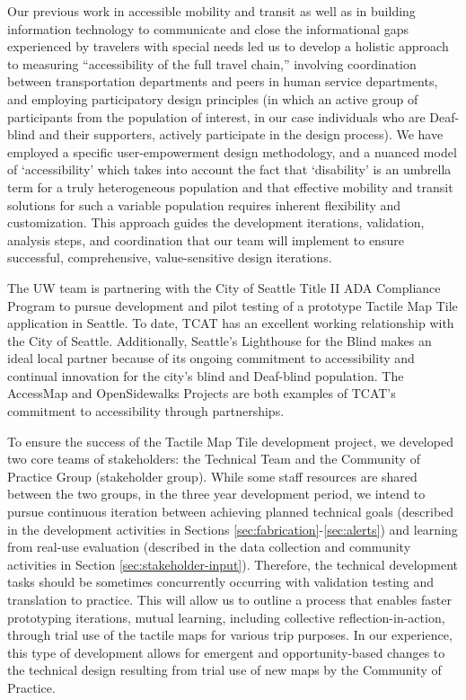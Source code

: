 Our previous work in accessible mobility and transit as well as in building information technology to communicate and close the informational gaps experienced by travelers with special needs led us to develop a holistic approach to measuring “accessibility of the full travel chain,” involving coordination between transportation departments and peers in human service departments, and employing participatory design principles (in which an active group of participants from the population of interest, in our case individuals who are Deaf-blind and their supporters, actively participate in the design process). We have employed a specific user-empowerment design methodology, and a nuanced model of ‘accessibility’ which takes into account the fact that ‘disability’ is an umbrella term for a truly heterogeneous population and that effective mobility and transit solutions for such a variable population requires inherent flexibility and customization. This approach guides the development iterations, validation, analysis steps, and coordination that our team will implement to ensure successful, comprehensive, value-sensitive design iterations.

The UW team is partnering with the City of Seattle Title II ADA Compliance Program to pursue development and pilot testing of a prototype Tactile Map Tile application in Seattle. To date, TCAT has an excellent working relationship with the City of Seattle. Additionally, Seattle's Lighthouse for the Blind makes an ideal local partner because of its ongoing commitment to accessibility and continual innovation for the city's blind and Deaf-blind population. The AccessMap and OpenSidewalks Projects are both examples of TCAT's commitment to accessibility through partnerships. 

To ensure the success of the Tactile Map Tile development project, we developed two core teams of stakeholders: the Technical Team and the Community of Practice Group (stakeholder group). While some staff resources are shared between the two groups, in the three year development period, we intend to pursue continuous iteration between achieving planned technical goals (described in the development activities in Sections \ref{sec:fabrication}-\ref{sec:alerts}) and learning from real-use evaluation (described in the data collection and community activities in Section \ref{sec:stakeholder-input}).
Therefore, the technical development tasks should be sometimes concurrently occurring with validation testing and translation to practice. This will allow us to outline a process that enables  faster prototyping iterations, mutual learning, including collective reflection-in-action, through trial use of the tactile maps for various trip purposes. In our experience, this type of development allows for emergent and opportunity-based changes to the technical design resulting from trial use of new maps by the Community of Practice. 

